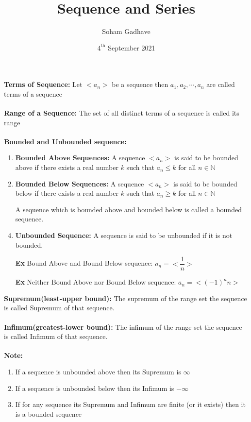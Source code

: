 \documentclass[a4paper]{article}
\title{Sequence and Series}
\author{Soham Gadhave}
\date{$4^{\text{th}}$ September 2021}
\begin{document}
\maketitle

\noindent\textbf{Terms of Sequence:} Let $ <a_n> $ be a sequence 
then $ a_1, a_2, \cdots, a_n $ are called terms of a sequence \\ \\ 
\textbf{Range of a Sequence:} The set of all distinct terms of a sequence
is called its range \\ \\
\textbf{Bounded and Unbounded sequence:}
\begin{enumerate}
    \item \textbf{Bounded Above Sequences:} A sequence $<a_n>$ is 
    said to be bounded above if there exists a real number $k$ such 
    that $a_n \le k$ for all $n \in \mathbb{N}$
    \item \textbf{Bounded Below Sequences:} A sequence $<a_n>$ is 
    said to be bounded below if there exists a real number $k$ such 
    that $a_n \ge k$ for all $n \in \mathbb{N}$
    \item[] A sequence which is bounded above and bounded below is called a 
    bounded sequence.
    \item \textbf{Unbounded Sequence: } A sequence is said to be
    unbounded if it is not bounded. 
    \item[\textbf{Ex}] Bound Above and Bound Below sequence: 
    $a_n = <\dfrac{1}{n}>$
    \item[\textbf{Ex}] Neither Bound Above nor Bound Below sequence: 
    $a_n = <(-1)^nn>$
\end{enumerate}
\textbf{Supremum(least-upper bound):} The supremum of the range set
the sequence is called Supremum of that sequence.\\ \\
\textbf{Infimum(greatest-lower bound):} The infimum of the range set
the sequence is called Infimum of that sequence.\\ \\
\textbf{Note:}
\begin{enumerate}
    \item If a sequence is unbounded above then its Supremum is $\infty$
    \item If a sequence is unbounded below then its Infimum is $-\infty$
    \item If for any sequence its Supremum and Infimum are finite (or it 
    exists) then it is a bounded sequence
\end{enumerate}
\end{document}
